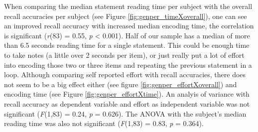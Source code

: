 \documentclass[a4paper,man,natbib,floatsintext,import]{apa6}
\begin{document}
When comparing the median statement reading time per subject with the overall recall accuracies per subject (see Figure \ref{fig:genper_timeXoverall}), one can see an improved recall accuracy with increased median encoding time, the correlation is significant (\textit{r}(83) = 0.55, \textit{p} < 0.001). Half of our sample has a median of more than 6.5 seconds reading time for a single statement. This could be enough time to take notes (a little over 2 seconds per item), or just really put a lot of effort into encoding those two or three items and repeating the previous statement in a loop. Although comparing self reported effort with recall accuracies, there does not seem to be a big effect either (see figure \ref{fig:genper_effortXoverall}) and encoding time (see Figure \ref{fig:genper_effortXtime}). An analyis of variance with recall accuracy as dependent variable and effort as independent variable was not significant (\textit{F}(1,83) = 0.24, \textit{p} = 0.626). The ANOVA with the subject's median reading time was also not significant (\textit{F}(1,83) = 0.83, \textit{p} = 0.364).

\end{document}
